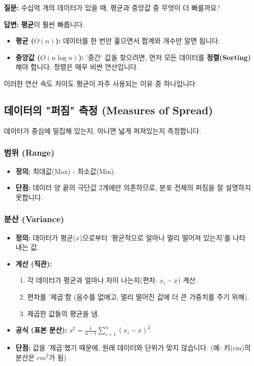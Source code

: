 \documentclass[11pt,a4paper]{book}
\theoremstyle{definition}
\begin{document}
\begin{examplebox}[title={어느 것이 더 빠를까? (Mean vs Median)}]
\textbf{질문:} 수십억 개의 데이터가 있을 때, 평균과 중앙값 중 무엇이 더 빠를까요?

\textbf{답변:} \textbf{평균}이 훨씬 빠릅니다.
\begin{itemize}
    \item \textbf{평균 ($O(n)$):} 데이터를 한 번만 훑으면서 합계와 개수만 알면 됩니다.
    \item \textbf{중앙값 ($O(n \log n)$):} '중간' 값을 찾으려면, 먼저 모든 데이터를 \textbf{정렬(Sorting)}해야 합니다. 정렬은 매우 비싼 연산입니다.
\end{itemize}
이러한 연산 속도 차이도 평균이 자주 사용되는 이유 중 하나입니다.
\end{examplebox}

\subsection{데이터의 "퍼짐" 측정 (Measures of Spread)}

데이터가 중심에 밀집해 있는지, 아니면 넓게 퍼져있는지 측정합니다.

\subsubsection{범위 (Range)}
\begin{itemize}
    \item \textbf{정의:} 최대값(Max) - 최소값(Min).
    \item \textbf{단점:} 데이터 양 끝의 극단값 2개에만 의존하므로, 분포 전체의 퍼짐을 잘 설명하지 못합니다.
\end{itemize}

\subsubsection{분산 (Variance)}

\begin{itemize}
    \item \textbf{정의:} 데이터가 평균($\overline{x}$)으로부터 '평균적으로 얼마나 멀리 떨어져 있는지'를 나타내는 값.
    \item \textbf{계산 (직관):}
    \begin{enumerate}
        \item 각 데이터가 평균과 얼마나 차이 나는지(편차: $x_i - \overline{x}$) 계산.
        \item 편차를 '제곱'함 (음수를 없애고, 멀리 떨어진 값에 더 큰 가중치를 주기 위해).
        \item 제곱한 값들의 평균을 냄.
    \end{enumerate}
    \item \textbf{공식 (표본 분산):} $s^2 = \frac{1}{n-1}\sum_{i=1}^{n}(x_i - \overline{x})^2$
    \item \textbf{단점:} 값을 '제곱'했기 때문에, 원래 데이터와 단위가 맞지 않습니다. (예: 키(cm)의 분산은 $cm^2$가 됨)
\end{itemize}
\end{document}
